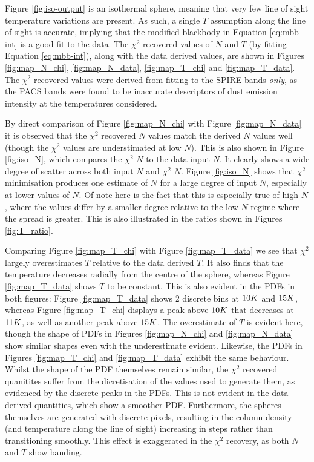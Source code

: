 \documentclass{report}
\begin{document}
Figure \ref{fig:iso-output} is an isothermal sphere, meaning that very few line of sight temperature variations are present. As such, a single $T$ assumption along the line of sight is accurate, implying that the modified blackbody in Equation \ref{eq:mbb-int} is a good fit to the data. The $\chi^{2}$ recovered values of $N$ and $T$ (by fitting Equation \ref{eq:mbb-int}), along with the data derived values, are shown in Figures \ref{fig:map_N_chi}, \ref{fig:map_N_data},
\ref{fig:map_T_chi} and \ref{fig:map_T_data}. The $\chi^{2}$ recovered values were derived from fitting to the SPIRE bands \textit{only}, as the PACS bands were found to be inaccurate descriptors of dust emission intensity at the temperatures considered.

By direct comparison of Figure \ref{fig:map_N_chi} with Figure \ref{fig:map_N_data} it is observed that the $\chi^{2}$ recovered $N$ values match the derived $N$ values well (though the $\chi^{2}$ values are understimated at low $N$). This is also shown in Figure \ref{fig:iso_N}, which compares the $\chi^{2}$ $N$ to the data input $N$. It clearly shows a wide degree of scatter across both input
$N$ and $\chi^{2}$ $N$. Figure \ref{fig:iso_N} shows that $\chi^{2}$ minimisation produces one estimate of $N$ for a large degree of input $N$, especially at lower values of $N$. Of note here is the fact that this is especially true of high $N$, where the values differ by a smaller degree relative to the low $N$ regime where the spread is greater. This is also illustrated in the ratios shown in Figures \ref{fig:T_ratio}.

Comparing Figure \ref{fig:map_T_chi} with Figure \ref{fig:map_T_data} we see that $\chi^{2}$ largely overestimates $T$ relative to the data derived $T$. It also finds that the temperature decreases radially from the centre of the sphere, whereas Figure \ref{fig:map_T_data} shows $T$ to be constant. This is also evident in the PDFs in both figures: Figure \ref{fig:map_T_data} shows 2 discrete bins at $10\/K$ and
$15\/K$, whereas Figure \ref{fig:map_T_chi} displays a peak above $10\/K$ that decreases at $11\/K$, as well as another peak above $15\/K$. The overestimate of $T$ is evident here, though the shape of PDFs in Figures \ref{fig:map_N_chi} and \ref{fig:map_N_data} show similar shapes even with the underestimate evident. Likewise, the PDFs in Figures
\ref{fig:map_T_chi} and \ref{fig:map_T_data} exhibit the same behaviour. Whilst the shape of the PDF themselves remain similar, the $\chi^{2}$ recovered quanitites suffer from the dicretisation of the values used to generate them, as evidenced by the discrete peaks in the PDFs. This is not evident in the data derived quantities, which show a smoother PDF. Furthermore, the spheres themselves are generated with discrete pixels, resulting in the column density (and temperature along the line of sight) increasing in steps rather than transitioning smoothly. This effect is exaggerated in the $\chi^{2}$ recovery, as both $N$ and $T$ show banding.
\end{document}
